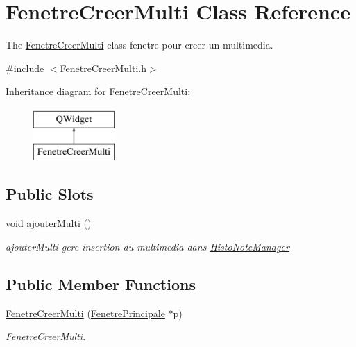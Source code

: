 \hypertarget{class_fenetre_creer_multi}{}\section{Fenetre\+Creer\+Multi Class Reference}
\label{class_fenetre_creer_multi}


The \hyperlink{class_fenetre_creer_multi}{Fenetre\+Creer\+Multi} class fenetre pour creer un multimedia.  




{\ttfamily \#include $<$Fenetre\+Creer\+Multi.\+h$>$}

Inheritance diagram for Fenetre\+Creer\+Multi\+:\begin{figure}[H]
\begin{center}
\leavevmode
\includegraphics[height=2.000000cm]{class_fenetre_creer_multi}
\end{center}
\end{figure}
\subsection*{Public Slots}
\begin{DoxyCompactItemize}
\item 
\mbox{\label{class_fenetre_creer_multi_a70f6413728fbd559a306c9af4f2c1e5f}} 
void \hyperlink{class_fenetre_creer_multi_a70f6413728fbd559a306c9af4f2c1e5f}{ajouter\+Multi} ()
\begin{DoxyCompactList}\small\item\em ajouter\+Multi gere insertion du multimedia dans \hyperlink{class_histo_note_manager}{Histo\+Note\+Manager} \end{DoxyCompactList}\end{DoxyCompactItemize}
\subsection*{Public Member Functions}
\begin{DoxyCompactItemize}
\item 
\hyperlink{class_fenetre_creer_multi_a231eaaeeeae9cccd5bab64515a6eeab8}{Fenetre\+Creer\+Multi} (\hyperlink{class_fenetre_principale}{Fenetre\+Principale} $\ast$p)
\begin{DoxyCompactList}\small\item\em \hyperlink{class_fenetre_creer_multi}{Fenetre\+Creer\+Multi}. \end{DoxyCompactList}\end{DoxyCompactItemize}


